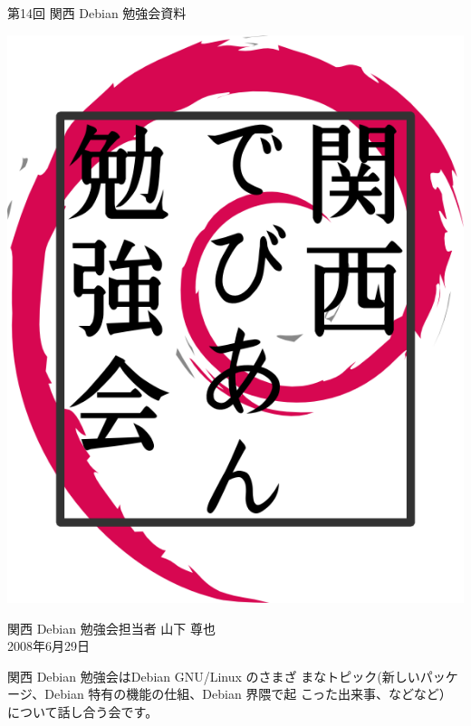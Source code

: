 \documentclass[mingoth,a4paper]{jsarticle}
\newcommand{\debmtgyear}{2008}
\newcommand{\debmtgdate}{29}
\newcommand{\debmtgmonth}{6}
\newcommand{\debmtgnumber}{14}
\begin{document}
\begin{titlepage}


 第\debmtgnumber{}回 関西 Debian 勉強会資料

\vspace{2cm}

\begin{center}
\includegraphics{image200802/kansaidebianlogo.png}
\end{center}

\begin{flushright}
\hfill{}関西 Debian 勉強会担当者 山下 尊也\\
\hfill{}\debmtgyear{}年\debmtgmonth{}月\debmtgdate{}日
\end{flushright}

\thispagestyle{empty}
\end{titlepage}

 
 関西 Debian 勉強会はDebian GNU/Linux のさまざ
 まなトピック(新しいパッケージ、Debian 特有の機能の仕組、Debian 界隈で起
 こった出来事、などなど）について話し合う会です。
\end{document}
